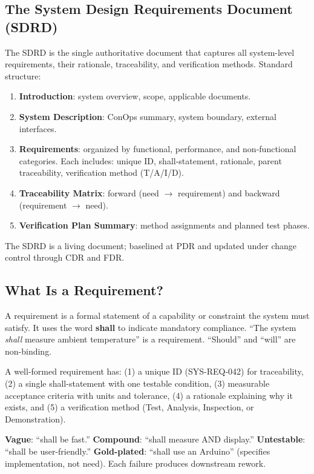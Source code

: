 \subsection{The System Design Requirements Document (SDRD)}
The SDRD is the single authoritative document that captures all system-level requirements, their rationale, traceability, and verification methods. Standard structure:
\begin{enumerate}[nosep,leftmargin=1.5em]
\item \textbf{Introduction}: system overview, scope, applicable documents.
\item \textbf{System Description}: ConOps summary, system boundary, external interfaces.
\item \textbf{Requirements}: organized by functional, performance, and non-functional categories. Each includes: unique ID, shall-statement, rationale, parent traceability, verification method (T/A/I/D).
\item \textbf{Traceability Matrix}: forward (need $\to$ requirement) and backward (requirement $\to$ need).
\item \textbf{Verification Plan Summary}: method assignments and planned test phases.
\end{enumerate}
The SDRD is a living document; baselined at PDR and updated under change control through CDR and FDR.


\subsection{What Is a Requirement?}
A requirement is a formal statement of a capability or constraint the system must satisfy. It uses the word \textbf{shall} to indicate mandatory compliance. ``The system \emph{shall} measure ambient temperature'' is a requirement. ``Should'' and ``will'' are non-binding.

A well-formed requirement has: (1) a unique ID (SYS-REQ-042) for traceability, (2) a single shall-statement with one testable condition, (3) measurable acceptance criteria with units and tolerance, (4) a rationale explaining why it exists, and (5) a verification method (Test, Analysis, Inspection, or Demonstration).

\begin{warningbox}
\textbf{Vague}: ``shall be fast.'' \textbf{Compound}: ``shall measure AND display.'' \textbf{Untestable}: ``shall be user-friendly.'' \textbf{Gold-plated}: ``shall use an Arduino'' (specifies implementation, not need). Each failure produces downstream rework.
\end{warningbox}

